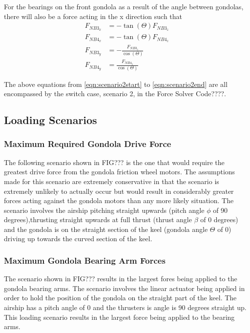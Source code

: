\documentclass[../main.tex]{subfiles}
\begin{document}
For the bearings on the front gondola as a result of the  angle between gondolas, there will also be a force acting in the x direction such that 
\begin{align}
F_{NB3_{x}} &= -\tan(\Theta) F_{NB3_{z}}\\ 
F_{NB4_{x}} &= -\tan(\Theta) F_{NB4_{z}}\\
F_{NB3_{y}} &= -\frac{F_{NB3_{z}}}{\cos(\Theta)} \\ F_{NB4_{y}} &= \frac{F_{NB4_{z}}}{\cos(\Theta)} \label{eqn:scenario2end}
\end{align}

The above equations from \ref{eqn:scenario2start} to \ref{eqn:scenario2end} are all encompassed by the switch case, scenario 2, in the Force Solver Code????. 


\subsection{Loading Scenarios} \label{loadingScenarios}
\subsubsection*{Maximum Required Gondola Drive Force}
The following scenario shown in FIG??? is the one that would require the greatest drive force from the gondola friction wheel motors. The assumptions made for this scenario are extremely conservative in that the scenario is extremely unlikely to actually occur but would result in considerably greater forces acting against the gondola motors than any more likely situation. The scenario involves the airship pitching straight upwards (pitch angle $\phi$ of 90 degrees),thrusting straight upwards at full thrust (thrust angle $\beta$ of 0 degrees) and the gondola is on the straight section of the keel (gondola angle $\Theta$ of 0) driving up towards the curved section of the keel.

\subsubsection*{Maximum Gondola Bearing Arm Forces}
The scenario shown in FIG??? results in the largest fores being applied to the gondola bearing arms. The scenario involves the linear actuator being applied in order to hold the position of the gondola on the straight part of the keel. The airship has a pitch angle of 0 and the thrusters is  angle is 90 degrees straight up. This loading scenario results in the largest force  being applied to the bearing arms.
\end{document}
